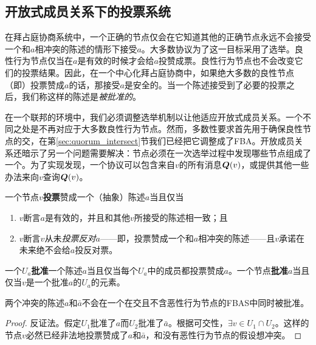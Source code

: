 \subsection{开放式成员关系下的投票系统}

在拜占庭协商系统中，一个正确的节点仅会在它知道其他的正确节点永远不会接受一个和$a$相冲突的陈述的情形下接受$a$。大多数协议为了这一目标采用了选举。良性行为节点仅当在$a$是有效的时候才会给$a$投赞成票。良性行为节点也不会改变它们的投票结果。因此，在一个中心化拜占庭协商中，如果绝大多数的良性节点（即{\quorum}）投票赞成$a$的话，那接受$a$是安全的。当一个陈述接受到了必要的投票之后，我们称这样的陈述是\textit{被批准的}。

在一个联邦的环境中，我们必须调整选举机制以让他适应开放式成员关系。一个不同之处是{\quorum}不再对应于大多数良性行为节点。然而，多数性要求首先用于确保良性节点的{\quorum}交，在第\ref{sec:quorum_intersect}节我们已经把它调整成了FBA。开放成员关系还暗示了另一个问题需要解决：节点必须在一次选举过程中发现哪些节点组成了一个{\quorum}。为了实现{\quorum}发现，一个协议可以包含来自$v$的所有消息${\bm Q}(v)$，或提供其他一些办法来向$v$查询${\bm Q}(v)$。

\begin{definition}[投票]
        一个节点$v$\textbf{投票}赞成一个（抽象）陈述$a$当且仅当
        \begin{enumerate}
                \item $v$断言$a$是有效的，并且和其他$v$所接受的陈述相一致；且
                \item $v$断言$v$从未\textit{投票反对}$a$——即，投票赞成一个和$a$相冲突的陈述——且$v$承诺在未来绝不会给$a$投反对票。
        \end{enumerate}
\end{definition}

\begin{definition}[批准]
        一个{\quorum}$U_a$\textbf{批准}一个陈述$a$当且仅当每个$U_a$中的成员都投票赞成$a$。一个节点\textbf{批准}$a$当且仅当$v$是一个批准$a$的{\quorum}$U_a$的元素。
\end{definition}

\begin{theorem}\label{th4}
        两个冲突的陈述$a$和$\bar a$不会在一个在{\quorum}交且不含恶性行为节点的FBAS中同时被批准。
\end{theorem}

\begin{proof}
        反证法。假定{\quorum}$U_1$批准了$a$而{\quorum}$U_2$批准了$\bar a$。根据{\quorum}可交性，$\exists v\in U_1\cap U_2$。这样的节点$v$必然已经非法地投票赞成了$a$和$\bar a$，和没有恶性行为节点的假设想冲突。
\end{proof}

